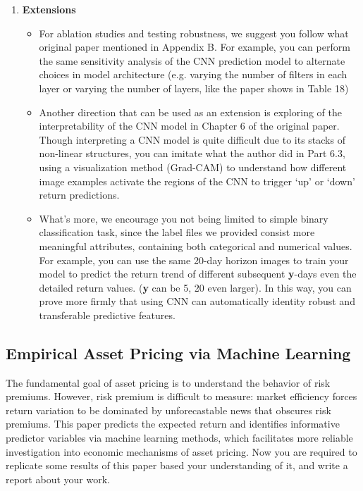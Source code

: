 \documentclass[11pt]{article}
\begin{document}
\begin{enumerate}
\begin{description}
    \end{description}
    
    \item \textbf{Extensions}
    
    \begin{itemize}
        \item For ablation studies and testing robustness, we suggest you follow what original paper mentioned in Appendix B. For example, you can perform the same sensitivity analysis of the CNN prediction model to alternate choices in model architecture (e.g. varying the number of filters in each layer or varying the number of layers, like the paper shows in Table 18) 
        
        \item Another direction that can be used as an extension is exploring of the interpretability of the CNN model in Chapter 6 of the original paper. Though interpreting a CNN model is quite difficult due to its stacks of non-linear structures, you can imitate what the author did in Part 6.3, using a visualization method (Grad-CAM) to understand how different image examples activate the regions of the CNN to trigger `up' or `down' return predictions.
        
        \item What's more, we encourage you not being limited to simple binary classification task, since the label files we provided consist more meaningful attributes, containing both categorical and numerical values. For example, you can use the same 20-day horizon images to train your model to predict the return trend of different subsequent \textbf{y}-days even the detailed return values. (\textbf{y} can be 5, 20 even larger). In this way, you can prove more firmly that using CNN can automatically identity robust and transferable predictive features.
    \end{itemize}

   
\end{enumerate}


\subsection{Empirical Asset Pricing via Machine Learning}

The fundamental goal of asset pricing is to understand the behavior of risk premiums. However, risk premium is difficult to measure: market efficiency forces return variation to be dominated by unforecastable news that obscures risk premiums. This paper predicts the expected return and identifies informative predictor variables via machine learning methods, which facilitates more reliable investigation into economic mechanisms of asset pricing. Now you are required to replicate some results of this paper based your understanding of it, and write a report about your work.
\end{document}
